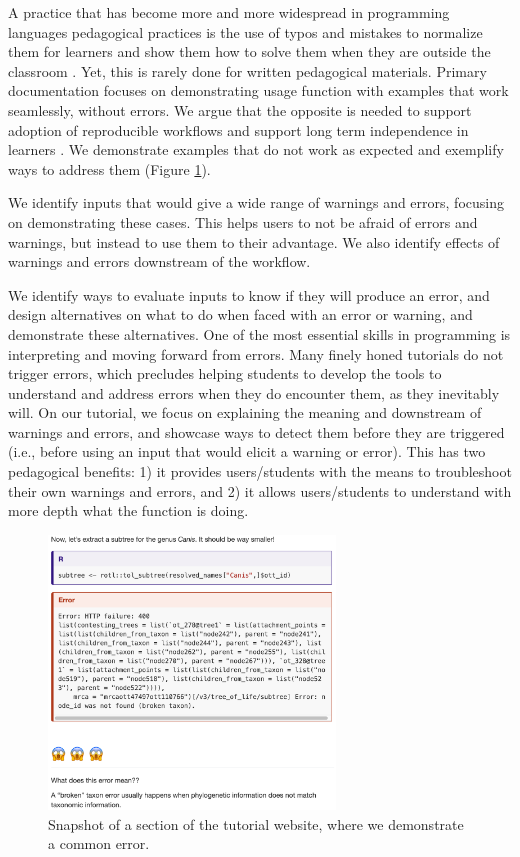 \documentclass[12pt]{article}
\begin{document}
A practice that has become more and more widespread in programming languages pedagogical practices
is the use of typos and mistakes to normalize them for learners and show them how
to solve them when they are outside the classroom \citep{shannon2015live}.
Yet, this is rarely done for written pedagogical materials.
Primary documentation focuses on demonstrating usage function with examples that
work seamlessly, without errors. We argue that the opposite is needed to support
adoption of reproducible workflows and support long term independence in learners
\citep{gaspar2007restoring}.
We demonstrate examples that do not work
as expected and exemplify ways to address them (Figure \ref{fig:first}).

We identify inputs that would give
a wide range of warnings and errors, focusing on demonstrating these cases. This
helps users to not be afraid of errors and warnings, but instead to use them to
their advantage.
We also identify effects of warnings and errors downstream of the workflow.

We identify ways to evaluate inputs to know if they will produce an error, and design
alternatives on what to do when faced with an error or warning, and demonstrate
these alternatives.
One of the most essential skills in programming is interpreting and moving forward
from errors.
Many finely honed tutorials do not trigger errors, which precludes helping students
to develop the tools to understand and address errors when they do encounter them,
as they inevitably will.
On our tutorial, we focus on explaining the meaning and downstream of warnings and errors, and
 showcase ways to detect them before they are triggered (i.e., before using an input
  that would elicit a warning or error). This has two pedagogical benefits:
1) it provides users/students with the means to troubleshoot their own warnings and errors, and
2) it allows users/students to understand with more depth what the function is doing.


\begin{figure}
\begin{center}
\includegraphics[width=3in]{fig1.png}
\end{center}
\caption{Snapshot of a section of the tutorial website, where we demonstrate a common error. \label{fig:first}}
\end{figure}
\end{document}
